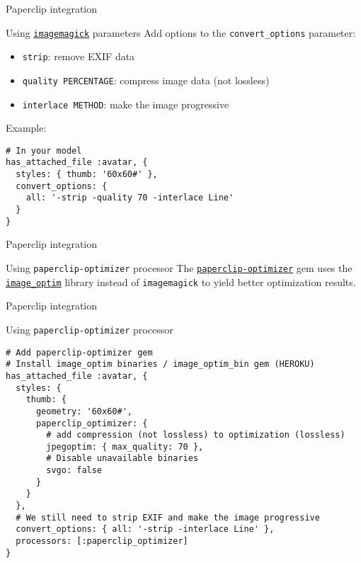 \documentclass{beamer}
\begin{document}
\begin{frame}[fragile]{Paperclip integration}
\begin{block}{Using \href{http://imagemagick.org/}{\lstinline{imagemagick}} parameters}
Add options to the \lstinline{convert_options} parameter:
\begin{itemize}
  \item \lstinline{strip}: remove EXIF data
  \item \lstinline{quality PERCENTAGE}: compress image data (not lossless)
  \item \lstinline{interlace METHOD}: make the image progressive
\end{itemize}
Example:
\begin{lstlisting}
# In your model
has_attached_file :avatar, {
  styles: { thumb: '60x60#' },
  convert_options: {
    all: '-strip -quality 70 -interlace Line'
  }
}
\end{lstlisting}
\end{block}
\end{frame}

\begin{frame}[fragile]{Paperclip integration}
\begin{block}{Using \lstinline{paperclip-optimizer} processor}
The \href{https://github.com/janfoeh/paperclip-optimizer}{\lstinline{paperclip-optimizer}} gem uses the \href{https://github.com/toy/image_optim}{\lstinline{image_optim}} library
instead of \lstinline{imagemagick} to yield better optimization results.
\end{block}
\end{frame}

\begin{frame}[fragile]{Paperclip integration}

Using \lstinline{paperclip-optimizer} processor

\begin{lstlisting}
# Add paperclip-optimizer gem
# Install image_optim binaries / image_optim_bin gem (HEROKU)
has_attached_file :avatar, {
  styles: {
    thumb: {
      geometry: '60x60#',
      paperclip_optimizer: {
        # add compression (not lossless) to optimization (lossless)
        jpegoptim: { max_quality: 70 },
        # Disable unavailable binaries
        svgo: false
      }
    }
  },
  # We still need to strip EXIF and make the image progressive
  convert_options: { all: '-strip -interlace Line' },
  processors: [:paperclip_optimizer]
}
\end{lstlisting}
\end{frame}
\end{document}
